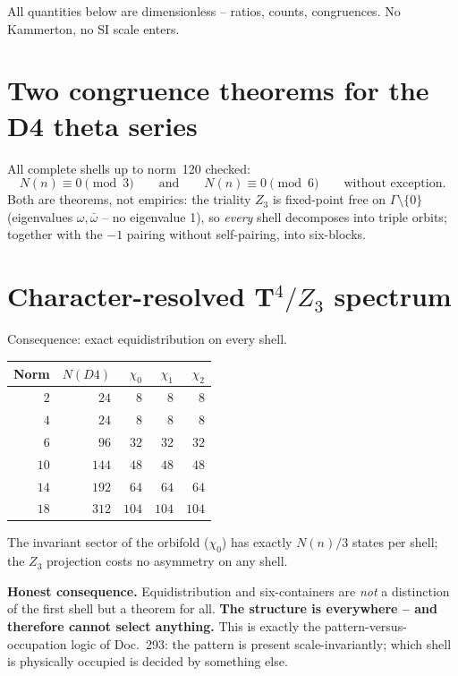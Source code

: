 \documentclass[11pt]{report}
\begin{document}
All quantities below are dimensionless -- ratios, counts,
congruences. No Kammerton, no SI scale enters.

\section{Two congruence theorems for the D4 theta series}

All complete shells up to norm~120 checked:
\begin{equation}
  N(n) \equiv 0 \pmod 3
  \qquad\text{and}\qquad
  N(n) \equiv 0 \pmod 6
  \qquad\text{without exception.}
\end{equation}
Both are theorems, not empirics: the triality $Z_3$ is fixed-point
free on $\Gamma\setminus\{0\}$ (eigenvalues $\omega,\bar\omega$ --
no eigenvalue 1), so \emph{every} shell decomposes into triple
orbits; together with the $-1$ pairing without self-pairing, into
six-blocks.

\section{Character-resolved T$^4/Z_3$ spectrum}

Consequence: exact equidistribution on every shell.

\begin{center}
\begin{tabular}{rrrrr}
\toprule
Norm & $N(D4)$ & $\chi_0$ & $\chi_1$ & $\chi_2$ \\
\midrule
$2$ & $24$ & $8$ & $8$ & $8$ \\
$4$ & $24$ & $8$ & $8$ & $8$ \\
$6$ & $96$ & $32$ & $32$ & $32$ \\
$10$ & $144$ & $48$ & $48$ & $48$ \\
$14$ & $192$ & $64$ & $64$ & $64$ \\
$18$ & $312$ & $104$ & $104$ & $104$ \\
\bottomrule
\end{tabular}
\end{center}

The invariant sector of the orbifold ($\chi_0$) has exactly $N(n)/3$
states per shell; the $Z_3$ projection costs no asymmetry on any
shell.

\textbf{Honest consequence.} Equidistribution and six-containers are
\emph{not} a distinction of the first shell but a theorem for all.
\textbf{The structure is everywhere -- and therefore cannot select
anything.} This is exactly the pattern-versus-occupation logic of
Doc.~293: the pattern is present scale-invariantly; which shell is
physically occupied is decided by something else.
\end{document}
